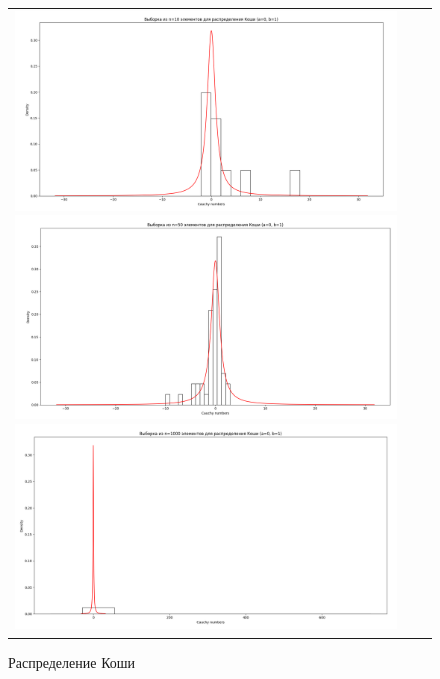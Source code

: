 \begin{figure}[H]
	\begin{tabular}{ccc}
		\includegraphics[scale=0.12]{resources/1_cauchy_10.png}
		\includegraphics[scale=0.12]{resources/1_cauchy_50.png}
		\includegraphics[scale=0.12]{resources/1_cauchy_1000.png}
	\end{tabular}
	\caption{Распределение Коши}
\end{figure}

